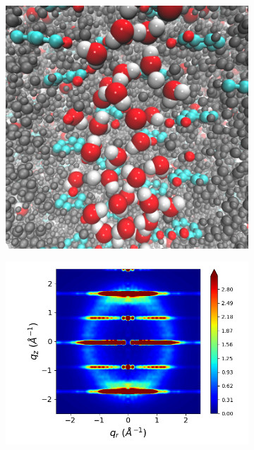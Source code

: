 \documentclass[journal=jpcbfk,manusciprt=article]{achemso}
\begin{document}
\begin{figure}[!htb]
\begin{subfigure}{0.3\linewidth}
  	\label{fig:rotated_monomers}
  \end{subfigure}
  \begin{subfigure}{0.3\linewidth}
  	\centering
  	\includegraphics[width=\textwidth]{solvated_pore_cross_section.png}  %
  	\label{fig:solvated_pore}
  \end{subfigure}
  \begin{subfigure}{0.3\linewidth}
  	\centering
  	\includegraphics[width=\textwidth]{staggered_rzplot_restrained.png}

\end{subfigure}
\end{figure}
\end{document}
